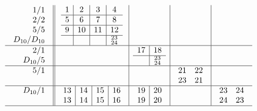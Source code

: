 \documentclass[12pt,a4paper]{amsart}
\begin{document}
\scriptsize {}
\begin{align*}
  \begin{array}{r||c|c|c|c}
    \begin{array}{r}
      1/1 \\ 2/2 \\ 5/5 \\ D_{10}/D_{10}
    \end{array}
    &
    \begin{array}{c|c|c|c}
1&2&3&4\\\hline
5&6&7&8\\\hline
9&10&11&12\\\hline
&&&^{23}_{24}\\
    \end{array}
&&&\\\hline
    \begin{array}{r}
      2/1 \\ D_{10}/5
    \end{array}
&&
    \begin{array}{c|c}
      17&18\\\hline
      &^{23}_{24}\\
    \end{array}
&&\\\hline
    \begin{array}{r}
      5/1 \\ \\
    \end{array}
&
&
&
  \begin{array}{cc}
21&22\\
23&21\\
  \end{array}
&\\\hline
    \begin{array}{r}
      D_{10}/1 \\  \\
    \end{array}
&
    \begin{array}{c|c|c|c}
13&14&15&16\\
13&14&15&16\\
    \end{array}
&
    \begin{array}{c|c}
      19&20\\
      19&20\\
    \end{array}
&
&
  \begin{array}{cc}
23&24\\
24&23\\
  \end{array}
\\\hline
  \end{array}
\end{align*}
\end{document}
